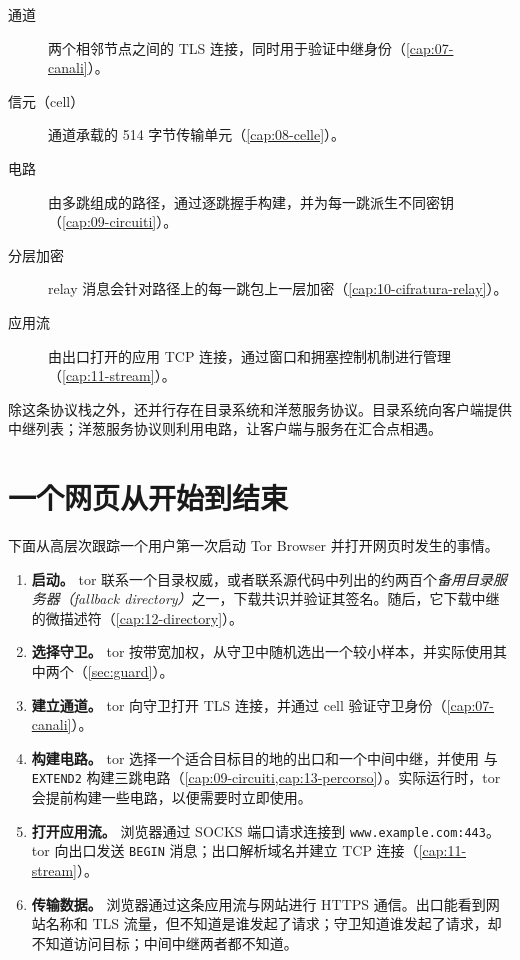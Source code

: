 \begin{description}
  \item[通道] 两个相邻节点之间的 TLS 连接，同时用于验证中继身份（\cref{cap:07-canali}）。
  \item[信元（cell）] 通道承载的 514 字节传输单元（\cref{cap:08-celle}）。
  \item[电路] 由多跳组成的路径，通过逐跳握手构建，并为每一跳派生不同密钥（\cref{cap:09-circuiti}）。
  \item[分层加密] relay 消息会针对路径上的每一跳包上一层加密（\cref{cap:10-cifratura-relay}）。
  \item[应用流] 由出口打开的应用 TCP 连接，通过窗口和拥塞控制机制进行管理（\cref{cap:11-stream}）。
\end{description}

除这条协议栈之外，还并行存在目录系统和洋葱服务协议。目录系统向客户端提供中继列表；洋葱服务协议则利用电路，让客户端与服务在汇合点相遇。

\section{一个网页从开始到结束}\label{sec:arch-percorso}

下面从高层次跟踪一个用户第一次启动 Tor Browser 并打开网页时发生的事情。

\begin{enumerate}
  \item \textbf{启动。} tor 联系一个目录权威，或者联系源代码中列出的约两百个\emph{备用目录服务器（fallback directory）}之一，下载共识并验证其签名。随后，它下载中继的微描述符（\cref{cap:12-directory}）。
  \item \textbf{选择守卫。} tor 按带宽加权，从守卫中随机选出一个较小样本，并实际使用其中两个（\cref{sec:guard}）。
  \item \textbf{建立通道。} tor 向守卫打开 TLS 连接，并通过  cell 验证守卫身份（\cref{cap:07-canali}）。
  \item \textbf{构建电路。} tor 选择一个适合目标目的地的出口和一个中间中继，并使用  与 \texttt{EXTEND2} 构建三跳电路（\cref{cap:09-circuiti,cap:13-percorso}）。实际运行时，tor 会提前构建一些电路，以便需要时立即使用。
  \item \textbf{打开应用流。} 浏览器通过 SOCKS 端口请求连接到 \texttt{www.example.com:443}。tor 向出口发送 \texttt{BEGIN} 消息；出口解析域名并建立 TCP 连接（\cref{cap:11-stream}）。
  \item \textbf{传输数据。} 浏览器通过这条应用流与网站进行 HTTPS 通信。出口能看到网站名称和 TLS 流量，但不知道是谁发起了请求；守卫知道谁发起了请求，却不知道访问目标；中间中继两者都不知道。
\end{enumerate}

